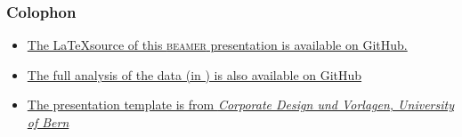 \documentclass[aspectratio=169, 10pt]{beamer}
\begin{document}
\begin{frame}
	\frametitle{Colophon}
	\begin{itemize}
			\item \href{https://github.com/habi/20190605_BrukerUserMeeting}{The \LaTeX source of this \textsc{beamer} presentation is available on GitHub.}
		\item \href{https://github.com/habi/Zebra-Fish-Gills/}{The full analysis of the data (in \faPython) is also available on GitHub}
		\item \href{http://intern.unibe.ch/dienstleistungen/corporate_design_und_vorlagen/praesentationen/index_ger.html}{The presentation template is from \emph{Corporate Design und Vorlagen, University of Bern}}
	\end{itemize}
\end{frame}
\end{document}
